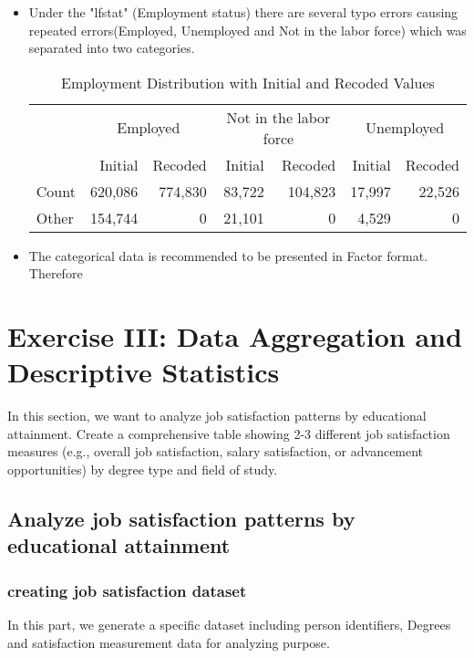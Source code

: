\documentclass[12pt]{article}
\begin{document}
\begin{itemize}
    \item Under the "lfstat" (Employment status) there are several typo errors causing repeated errors(Employed, Unemployed and Not in the labor force) which was separated into two categories.

\begin{table}[h]
    \begin{flushright}  %
    \renewcommand{\arraystretch}{1.2} %
    \setlength{\tabcolsep}{8pt} %
    \begin{tabular}{|l|r|r|r|r|r|r|}
        \hline
        & \multicolumn{2}{c|}{Employed} & \multicolumn{2}{c|}{Not in the labor force} & \multicolumn{2}{c|}{Unemployed} \\
        \cline{2-6}
        & Initial & Recoded & Initial & Recoded & Initial & Recoded \\
        \hline
        Count & 620,086 & 774,830 & 83,722 & 104,823 & 17,997 & 22,526  \\
        \hline
        Other & 154,744 & 0 & 21,101 & 0 & 4,529 & 0 \\
        \hline
    \end{tabular}
    \caption{Employment Distribution with Initial and Recoded Values}
    \label{tab:degree_dist}
    \end{flushright}
\end{table}
    \item The categorical data is recommended to be presented in Factor format. Therefore 
\end{itemize}





\section{Exercise III: Data Aggregation and Descriptive Statistics}
In this section, we want to analyze job satisfaction patterns by educational attainment. Create a comprehensive table showing 2-3 different job satisfaction measures (e.g., overall job satisfaction, salary satisfaction, or advancement opportunities) by degree type and field of study.

\subsection{Analyze job satisfaction patterns by educational attainment} 
\subsubsection{creating job satisfaction dataset}
In this part, we generate a specific dataset including person identifiers, Degrees and satisfaction measurement data for analyzing purpose.
\end{document}
